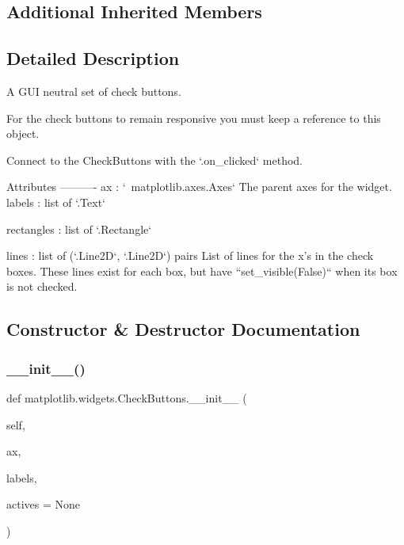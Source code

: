 \subsection*{Additional Inherited Members}


\subsection{Detailed Description}
\begin{DoxyVerb}A GUI neutral set of check buttons.

For the check buttons to remain responsive you must keep a
reference to this object.

Connect to the CheckButtons with the `.on_clicked` method.

Attributes
----------
ax : `~matplotlib.axes.Axes`
    The parent axes for the widget.
labels : list of `.Text`

rectangles : list of `.Rectangle`

lines : list of (`.Line2D`, `.Line2D`) pairs
    List of lines for the x's in the check boxes.  These lines exist for
    each box, but have ``set_visible(False)`` when its box is not checked.
\end{DoxyVerb}
 

\subsection{Constructor \& Destructor Documentation}
\mbox{\label{classmatplotlib_1_1widgets_1_1CheckButtons_a263cab4962771dad32ae9f7bff5ac9b4}} 
\subsubsection{\texorpdfstring{\+\_\+\+\_\+init\+\_\+\+\_\+()}{\_\_init\_\_()}}
{\footnotesize\ttfamily def matplotlib.\+widgets.\+Check\+Buttons.\+\_\+\+\_\+init\+\_\+\+\_\+ (\begin{DoxyParamCaption}\item[{}]{self,  }\item[{}]{ax,  }\item[{}]{labels,  }\item[{}]{actives = {\ttfamily None} }\end{DoxyParamCaption})}

